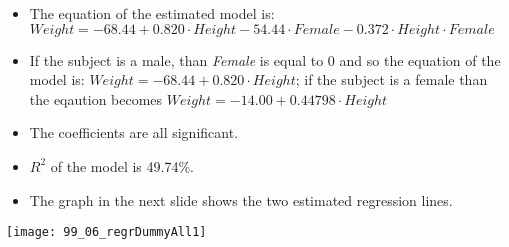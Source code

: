 \begin{frame}
  \vspace{0.5cm}
  \begin{itemize}
    \item The equation of the estimated model is: $ Weight = -68.44 + 0.820 \cdot Height - 54.44 \cdot Female - 0.372 \cdot Height \cdot Female $
    \vspace{0.15cm}
    \item If the subject is a male, than \textit{Female} is equal to 0 and so the equation of the model is: $ Weight = -68.44 + 0.820 \cdot Height $; if the subject is a female than the eqaution becomes $ Weight = -14.00 + 0.44798 \cdot Height $
    \vspace{0.15cm}
    \item The coefficients are all significant.
    \vspace{0.15cm}
    \item $R^2$ of the model is 49.74\%.
    \vspace{0.15cm}
    \item The graph in the next slide shows the two estimated regression lines.
  \end{itemize}
\end{frame}

\begin{frame}
  \vspace{-0.3cm}
  \begin{center}
    \texttt{[image: 99\_06\_regrDummyAll1]}
  \end{center}
\end{frame}



